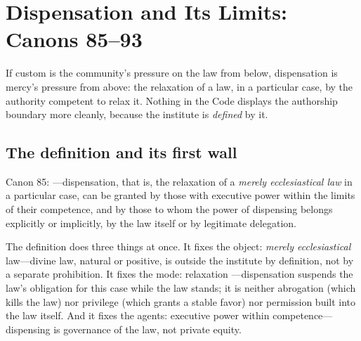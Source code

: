 \section{Dispensation and Its Limits: Canons 85--93}

If custom is the community's pressure on the law from below, dispensation is mercy's pressure from above: the relaxation of a law, in a particular case, by the authority competent to relax it. Nothing in the Code displays the authorship boundary more cleanly, because the institute is \emph{defined} by it.

\subsection{The definition and its first wall}

Canon 85: ---dispensation, that is, the relaxation of a \emph{merely ecclesiastical law} in a particular case, can be granted by those with executive power within the limits of their competence, and by those to whom the power of dispensing belongs explicitly or implicitly, by the law itself or by legitimate delegation.

The definition does three things at once. It fixes the object: \emph{merely ecclesiastical} law---divine law, natural or positive, is outside the institute by definition, not by a separate prohibition. It fixes the mode: relaxation ---dispensation suspends the law's obligation for this case while the law stands; it is neither abrogation (which kills the law) nor privilege (which grants a stable favor) nor permission built into the law itself. And it fixes the agents: executive power within competence---dispensing is governance of the law, not private equity.

